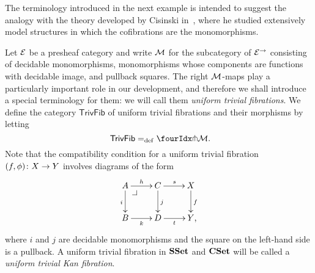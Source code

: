 \documentclass[reqno,10pt,a4paper,oneside,draft]{amsart}
\begin{document}
\medskip

The terminology introduced in the next example is intended to suggest the analogy with the theory developed by Cisinski in~\cite{cisinski-asterisque}, where he studied extensively model structures in which the cofibrations are the monomorphisms.



\begin{example} \label{exa-triv-kan-fib}
Let $\catE$ be a presheaf category and write $\cal{M}$ for the subcategory of $\cal{E}^\to$ consisting of decidable monomorphisms, \ie monomorphisms whose components are functions with decidable image, and pullback squares.
The right $\cal{M}$-maps play a particularly important role in our development, and therefore we shall introduce a special terminology for them: we will call them \emph{uniform trivial fibrations}.
We define the category $\mathsf{TrivFib}$ of uniform trivial fibrations and their morphisms by letting
\[
 \mathsf{TrivFib} \defeq \liftr{\cal{M}} \rlap{.}
\]
Note that the compatibility condition for a uniform trivial fibration $(f, \phi) \co X \to Y$ involves diagrams of the form
\[
\xymatrix{
A \ar[r]^{h} \ar[d]_{i} \pullback{dr} & C \ar[d]^{j} \ar[r]^s & X \ar[d]^f \\
B \ar[r]_{k} & D \ar[r]_t & Y \rlap{,}}
\]
where $i$ and $j$ are decidable monomorphisms and the square on the left-hand side is a pullback.
A uniform trivial fibration in $\SSet$ and $\CSet$ will be called a \emph{uniform trivial Kan fibration}.
\end{example}

\medskip
\end{document}
